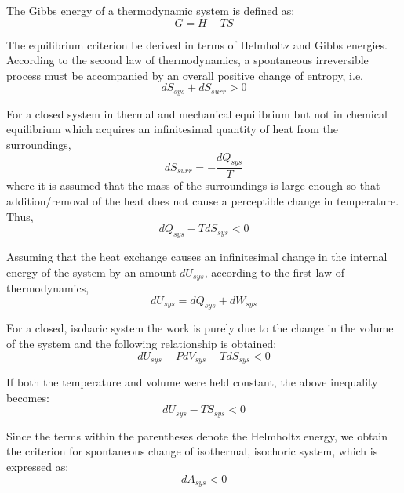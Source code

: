 		The Gibbs energy of a thermodynamic system is defined as:
		\begin{equation}
			G = H - TS
		\end{equation}
		
		The equilibrium criterion be derived in terms of Helmholtz and Gibbs energies. According to the second law of thermodynamics, a spontaneous irreversible process must be accompanied by an overall positive change of entropy, i.e.
		\begin{equation}
			dS_{sys} + dS_{surr} > 0
		\end{equation}
		
		For a closed system in thermal and mechanical equilibrium but not in chemical equilibrium which acquires an infinitesimal quantity of heat from the surroundings, 
		\begin{equation}
			dS_{surr} = -\frac{dQ_{sys}}{T}
		\end{equation}
		where it is assumed that the mass of the surroundings is large enough so that addition/removal of the heat does not cause a perceptible change in temperature. Thus,
		\begin{equation}
			{dQ_{sys}} - T dS_{sys}  < 0
		\end{equation}
		
		Assuming that the heat exchange causes an infinitesimal change in the internal energy of the system by an amount $dU_{sys}$, according to the first law of thermodynamics, 
		\begin{equation}
			{dU_{sys}} = {dQ_{sys}} + {dW_{sys}}
		\end{equation}

		For a closed, isobaric system the work is purely due to the change in the volume of the system and the following relationship is obtained:
		\begin{equation}
			{dU_{sys}} + P{dV_{sys}} - T{dS_{sys}} < 0
		\end{equation}
		
		If both the temperature and volume were held constant, the above inequality becomes:
		\begin{equation}
			d{U_{sys} - TS_{sys} } < 0
		\end{equation}
		
		Since the terms within the parentheses denote the Helmholtz energy, we obtain the criterion for spontaneous change of isothermal, isochoric system, which is expressed as:
		\begin{equation}
			d{A_{sys} } < 0
		\end{equation}
		
